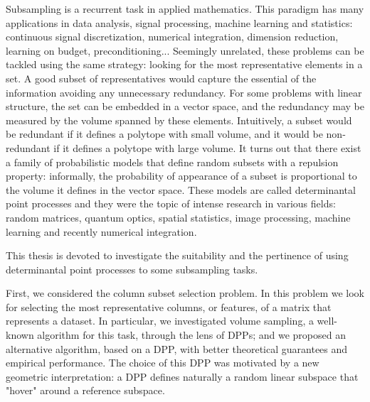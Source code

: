 \documentclass[twoside,11pt]{book}
\numberwithin{theorem}{chapter}
\numberwithin{definition}{chapter}
\numberwithin{proposition}{chapter}
\numberwithin{corollary}{chapter}
\numberwithin{example}{chapter}
\numberwithin{lemma}{chapter}
\numberwithin{assumption}{chapter}
\numberwithin{equation}{chapter}
\numberwithin{figure}{chapter}
\begin{document}
Subsampling is a recurrent task in applied mathematics. This paradigm has many applications in data analysis, signal processing, machine learning and statistics: continuous signal discretization, numerical integration, dimension reduction, learning on budget, preconditioning... Seemingly unrelated, these problems can be tackled using the same strategy: looking for the most representative elements in a set. 
A good subset of representatives would capture the essential of the information avoiding any unnecessary redundancy. For some problems with linear structure, the set can be embedded in a vector space, and 
 the redundancy may be measured by the volume spanned by these elements. Intuitively, a subset would be redundant if it defines a polytope with small volume, and it would be non-redundant if it defines a polytope with large volume. It turns out that there exist a family of probabilistic models that define random subsets with a repulsion property: informally, the probability of appearance of a subset is proportional to the volume it defines in the vector space. These models are called determinantal point processes and they were
 the topic of intense research in various fields: random matrices, quantum optics, spatial statistics, image processing, machine learning and recently numerical integration. 

This thesis is devoted to investigate the suitability and the pertinence of using determinantal point processes to some subsampling tasks.

First, we considered the column subset selection problem. In this problem we look for selecting the most representative columns, or features, of a matrix that represents a dataset. In particular, we investigated volume sampling, a well-known algorithm for this task, through the lens of DPPs; and we proposed an alternative algorithm, based on a DPP, with better theoretical guarantees and empirical performance. The choice of this DPP was motivated by a new geometric interpretation: a DPP defines naturally a random linear subspace that "hover" around a reference  subspace. 
\end{document}
